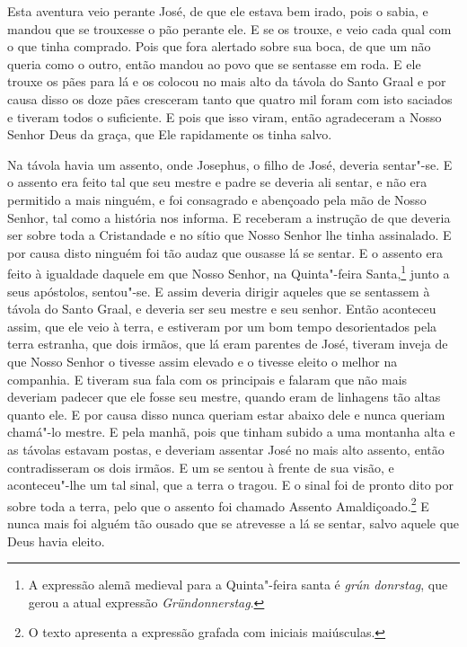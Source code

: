 Esta aventura veio perante José, de que ele estava bem irado, pois o sabia,
e mandou que se trouxesse o pão perante ele. E se os trouxe, e veio cada qual
com o que tinha comprado. Pois que fora alertado sobre sua boca, de que um não
queria como o outro, então mandou ao povo que se sentasse em roda. E ele trouxe
os pães para lá e os colocou no mais alto da távola do Santo Graal e por causa
disso os doze pães cresceram tanto que quatro mil foram com isto saciados e
tiveram todos o suficiente. E pois que isso viram, então agradeceram a Nosso
Senhor Deus da graça, que Ele rapidamente os tinha salvo.

Na távola havia um assento, onde Josephus, o filho de José, deveria
sentar"-se. E o assento era feito tal que seu mestre e padre se deveria ali
sentar, e não era permitido a mais ninguém, e foi consagrado e abençoado pela
mão de Nosso Senhor, tal como a história nos informa. E receberam a instrução
de que deveria ser sobre toda a Cristandade e no sítio que Nosso Senhor lhe
tinha assinalado. E por causa disto ninguém foi tão audaz que ousasse lá se
sentar. E o assento era feito à igualdade daquele em que Nosso Senhor, na
Quinta"-feira Santa,\footnote{ A expressão alemã medieval para a Quinta"-feira
santa é \textit{grún donrstag},  que gerou
a atual expressão \textit{Gründonnerstag}.}  junto a seus
apóstolos, sentou"-se. E assim deveria dirigir aqueles que se sentassem à távola
do Santo Graal, e deveria ser seu mestre e seu senhor. Então aconteceu assim,
que ele veio à terra, e estiveram por um bom tempo desorientados pela terra
estranha, que dois irmãos, que lá eram parentes de José, tiveram inveja de que
Nosso Senhor o tivesse assim elevado e o tivesse eleito o melhor na companhia.
E tiveram sua fala com os principais e falaram que não mais
deveriam padecer que ele fosse seu mestre, quando eram de linhagens tão altas
quanto ele. E por causa disso nunca queriam estar abaixo dele e nunca queriam
chamá"-lo mestre. E pela manhã, pois que tinham subido a uma montanha alta e as
távolas estavam postas, e deveriam assentar José no mais alto assento, então
contradisseram os dois irmãos. E um se sentou à frente de sua visão, e
aconteceu"-lhe um tal sinal, que a terra o tragou. E o sinal foi de pronto dito
por sobre toda a terra, pelo que o assento foi chamado Assento
Amaldiçoado.\footnote{ O texto apresenta a expressão grafada
com iniciais maiúsculas.} E nunca mais foi alguém tão ousado que
se atrevesse a lá se sentar, salvo aquele que Deus havia eleito. 

